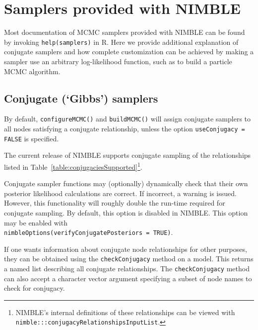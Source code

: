 \documentclass[12pt,oneside]{book}\usepackage[]{graphicx}\usepackage[]{color}
\def\cd#1{\texttt{#1}}
\begin{document}
\section{Samplers provided with NIMBLE}
\label{sec:samplers-provided}

Most documentation of MCMC samplers provided with NIMBLE can be found by invoking \cd{help(samplers)} in R.  Here we provide additional explanation of conjugate samplers and how complete customization can be achieved by making a sampler use an arbitrary log-likelihood function, such as to build a particle MCMC algorithm.



\subsection{Conjugate (`Gibbs') samplers}
By default, \cd{configureMCMC()} and \cd{buildMCMC()} will assign conjugate samplers to all nodes satisfying a conjugate relationship, unless the option \cd{useConjugacy = FALSE} is specified.  

The current release of NIMBLE supports conjugate sampling of the relationships listed in Table~\ref{table:conjugaciesSupported}\footnote{NIMBLE's internal definitions of these relationships can be viewed with \cd{nimble:::conjugacyRelationshipsInputList}.}.



Conjugate sampler functions may (optionally) dynamically check that their own posterior likelihood calculations are correct.  If incorrect, a warning is issued.  However, this functionality will roughly double the run-time required for conjugate sampling.  By default, this option is disabled in NIMBLE.  This option may be enabled with\\\cd{nimbleOptions(verifyConjugatePosteriors = TRUE)}.

If one wants information about conjugate node relationships for other purposes, they can be obtained using the \cd{checkConjugacy} method on a model.  This returns a named list describing all conjugate relationships.  The \cd{checkConjugacy} method can also accept a character vector argument specifying a subset of node names to check for conjugacy. 



\end{document}
